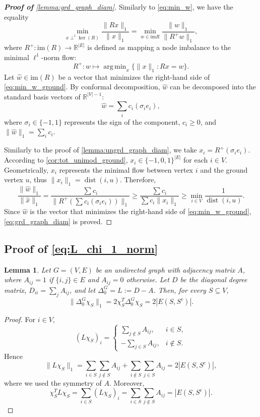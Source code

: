 \documentclass{article}
\newtheorem{lemma}{Lemma}[section]
\newcommand{\im}{\mathrm{im}}
\newcommand{\dist}{\operatorname{dist}}
\DeclareMathOperator*{\argmin}{arg\,min}
\begin{document}
\begin{proof}[\textbf{Proof of} \cref{lemma:grd_graph_diam}]
Similarly to \cref{eq:min_w},
we have the equality
\begin{equation}\label{eq:min_w_ground}
\min_{x\perp^1\ker(R)}\frac{\|Rx\|_1}{\|x\|_1}=
\min_{w\in \im R}\frac{\|w\|_1}{\|R^{+}w\|_1},
\end{equation}
where $R^+:\im(R)\to \mathbb{R}^{|E|}$ is defined as mapping a node imbalance to the minimal $\ell^1$-norm flow:
\[
R^{+}:w\mapsto \argmin_{x}\{ \|x\|_1 : Rx = w \}.
\]
Let $\widehat{w}\in \im (R)$ be a vector that minimizes the right-hand side of \cref{eq:min_w_ground}.
By conformal decomposition,
$\widehat{w}$ can be decomposed into the standard basis vectors of $\mathbb{R}^{|V|-1}$:
\[
\widehat{w}=
\sum_i c_i(\sigma_i e_i),
\]
where $\sigma_i \in \{-1, 1\}$ represents the sign of the component,
$c_i\geq 0$,
and $\|\widehat{w}\|_1=\sum\limits_i c_i$.

Similarly to the proof of \cref{lemma:ungrd_graph_diam},
we take $x_i=R^{+}(\sigma_i e_i)$.
According to \cref{cor:tot_unimod_ground},
$x_i\in \{-1, 0, 1\}^{|E|}$ for each $i\in V$.
Geometrically, $x_i$ represents the minimal flow between vertex $i$ and the ground vertex $u$,
thus $\|x_i\|_1 = \dist(i, u)$.
Therefore,
\[
\frac{\|\widehat{w}\|_1}{\|\widehat{x}\|_1} = 
\frac{\sum c_{i}}{\| R^{+}\left(\sum c_{i}(\sigma_i  e_i)\right) \|_1} \geq 
\frac{\sum c_{i}}{\sum c_{i} \|x_{i}\|_1}\geq
\min_{i\in V}\frac{1}{\dist (i, u)}.
\]
Since $\widehat{w}$ is the vector that minimizes the right-hand side of \cref{eq:min_w_ground},
\cref{eq:grd_graph_diam} is proved.
\end{proof}




\subsection{Proof of \cref{eq:L_chi_1_norm}}
\label{app.proof.of.eq}
\begin{lemma}
Let \(G=(V,E)\) be an undirected graph with adjacency matrix \(A\), where \(A_{ij}=1\) if \(\{i,j\}\in E\) and \(A_{ij}=0\) otherwise. Let \(D\) be the diagonal degree matrix, \(D_{ii}=\sum_j A_{ij}\), and let \(\Delta_0^G=L:=D-A\). Then, for every \(S\subseteq V\),
\[
\|\Delta_0^G\chi_S\|_1=2\chi_S^T\Delta_0^G\chi_S=2|E(S,S^c)|.
\]
\end{lemma}

\begin{proof}
For \(i\in V\),
\[
(L\chi_S)_i=
\begin{cases}
\sum_{j\notin S}A_{ij}, & i\in S,\\
-\sum_{j\in S}A_{ij}, & i\notin S.
\end{cases}
\]
Hence
\[
\|L\chi_S\|_1=\sum_{i\in S}\sum_{j\notin S}A_{ij}+\sum_{i\notin S}\sum_{j\in S}A_{ij}=2|E(S,S^c)|,
\]
where we used the symmetry of \(A\). Moreover,
\[
\chi_S^TL\chi_S=\sum_{i\in S}(L\chi_S)_i=\sum_{i\in S}\sum_{j\notin S}A_{ij}=|E(S,S^c)|.
\]
\end{proof}

\end{document}
